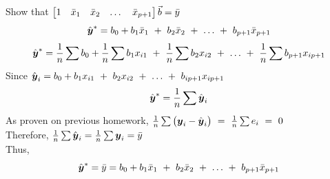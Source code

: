 \documentclass[12pt]{article}
\begin{document}
\begin{enumerate}

Show that $\begin{bmatrix}
1 & \bar{x}_1 & \bar{x}_2 & \dots & \bar{x}_{p+1}
\end{bmatrix}
\vec{b} = \bar{y}$ \\
$$\hat{\boldsymbol{y}}^{*} = b_0 + b_1 \bar{x}_1 \ + \ b_2 \bar{x}_2 \ + \ \dots \ + \ b_{p+1} \bar{x}_{p+1}$$
$$ \yhat^{*} = \frac{1}{n} \sum b_0 + \frac{1}{n} \sum b_1 x_{i1} \ + \ \frac{1}{n} \sum b_2 x_{i2} \ + \ \dots \ + \ \frac{1}{n} \sum b_{p+1} x_{i p+1}$$
Since $\yhat_i = b_0 + b_1 x_{i1} \ + \ b_2 x_{i2} \ + \ \dots \ + \ b_{i p+1} x_{ ip+1}$ \\
$$\hat{\boldsymbol{y}}^{*} = \frac{1}{n} \sum \hat{\boldsymbol{y}}_i$$
As proven on previous homework, $\frac{1}{n} \sum \big( \y_i - \yhat_i \big) \ = \ \frac{1}{n} \sum e_i \ = \ 0$ \\
Therefore, $\frac{1}{n} \sum \hat{\boldsymbol{y}}_i  =  \frac{1}{n} \sum \boldsymbol{y}_i = \bar{y}$\\
Thus, $$\hat{\boldsymbol{y}}^{*} = \bar{y} = b_0 + b_1 \bar{x}_1 \ + \ b_2 \bar{x}_2 \ + \ \dots \ + \ b_{p+1} \bar{x}_{p+1}$$


\end{enumerate}

\end{document}
